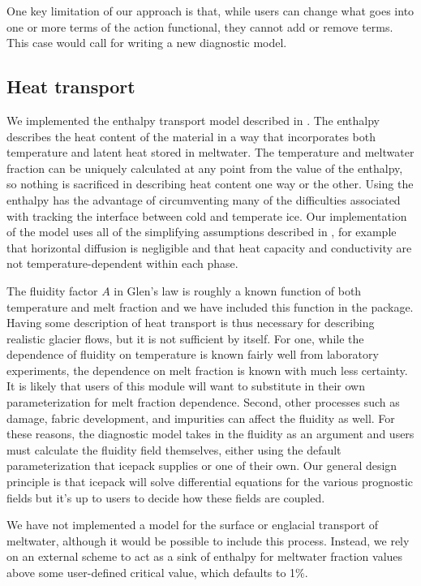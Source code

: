\documentclass[journal abbreviation, manuscript]{copernicus}
\begin{document}
One key limitation of our approach is that, while users can change what goes into one or more terms of the action functional, they cannot add or remove terms.
This case would call for writing a new diagnostic model.

\subsection{Heat transport} \label{sec:heat-transport}

We implemented the enthalpy transport model described in \citet{aschwanden2012enthalpy}.
The enthalpy describes the heat content of the material in a way that incorporates both temperature and latent heat stored in meltwater.
The temperature and meltwater fraction can be uniquely calculated at any point from the value of the enthalpy, so nothing is sacrificed in describing heat content one way or the other.
Using the enthalpy has the advantage of circumventing many of the difficulties associated with tracking the interface between cold and temperate ice.
Our implementation of the model uses all of the simplifying assumptions described in \citet{aschwanden2012enthalpy}, for example that horizontal diffusion is negligible and that heat capacity and conductivity are not temperature-dependent within each phase.

The fluidity factor $A$ in Glen's law is roughly a known function of both temperature and melt fraction and we have included this function in the package.
Having some description of heat transport is thus necessary for describing realistic glacier flows, but it is not sufficient by itself.
For one, while the dependence of fluidity on temperature is known fairly well from laboratory experiments, the dependence on melt fraction is known with much less certainty.
It is likely that users of this module will want to substitute in their own parameterization for melt fraction dependence.
Second, other processes such as damage, fabric development, and impurities can affect the fluidity as well.
For these reasons, the diagnostic model takes in the fluidity as an argument and users must calculate the fluidity field themselves, either using the default parameterization that icepack supplies or one of their own.
Our general design principle is that icepack will solve differential equations for the various prognostic fields but it's up to users to decide how these fields are coupled.

We have not implemented a model for the surface or englacial transport of meltwater, although it would be possible to include this process.
Instead, we rely on an external scheme to act as a sink of enthalpy for meltwater fraction values above some user-defined critical value, which defaults to 1\%.
\end{document}
